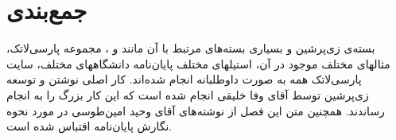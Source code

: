 \section{جمع‌بندی}
بسته‌ی زی‌پرشین و بسیاری بسته‌های مرتبط با آن مانند  و ، مجموعه پارسی‌لاتک، مثالهای مختلف موجود در آن، استیلهای مختلف پایان‌نامه دانشگاههای مختلف، سایت پارسی‌لاتک همه به صورت داوطلبانه انجام شده‌اند. کار اصلی نوشتن و توسعه زی‌پرشین توسط آقای وفا خلیقی انجام شده است که این کار بزرگ را به انجام رساندند. همچنین متن این فصل از نوشته‌های آقای وحید امین‌طوسی در مورد نحوه نگارش پایان‌نامه اقتباس شده است.